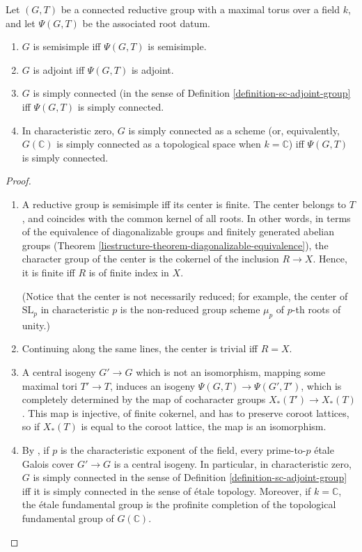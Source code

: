 \begin{proposition}
 \label{proposition-sc-adjoint-group}
Let $(G,T)$ be a connected reductive group with a maximal torus over a field $k$, and let $\Psi(G,T)$ be the associated root datum.
\begin{enumerate}
\item $G$ is semisimple iff $\Psi(G,T)$ is semisimple.
\item $G$ is adjoint iff $\Psi(G,T)$ is adjoint.
\item $G$ is simply connected (in the sense of Definition \ref{definition-sc-adjoint-group} iff $\Psi(G,T)$ is simply connected. 
\item In characteristic zero, $G$ is simply connected as a scheme (or, equivalently, $G(\mathbb C)$ is simply connected as a topological space when $k=\mathbb C$) iff $\Psi(G,T)$ is simply connected.
\end{enumerate}

\end{proposition}

\begin{proof}
\begin{enumerate}
 \item A reductive group is semisimple iff its center is finite. The center belongs to $T$, and coincides with the common kernel of all roots. In other words, in terms of the equivalence of diagonalizable groups and finitely generated abelian groups (Theorem \ref{liestructure-theorem-diagonalizable-equivalence}), the character group of the center is the cokernel of the inclusion $R\to X$. Hence, it is finite iff $R$ is of finite index in $X$.
 
 (Notice that the center is not necessarily reduced; for example, the center of $\text{SL}_p$ in characteristic $p$ is the non-reduced group scheme $\mu_p$ of $p$-th roots of unity.)
 
 \item Continuing along the same lines, the center is trivial iff $R=X$.
 
 \item A central isogeny $G'\to G$ which is not an isomorphism, mapping some maximal tori $T'\to T$,  induces an isogeny $\Psi(G,T)\to \Psi(G',T')$, which is completely determined by the map of cocharacter groups $X_*(T')\to X_*(T)$. This map is injective, of finite cokernel, and has to preserve coroot lattices, so if $X_*(T)$ is equal to the coroot lattice, the map is an isomorphism.
 
 \item By \cite[Theorem 1]{Brion-Szamuely}, if $p$ is the characteristic exponent of the field, every prime-to-$p$ \'etale Galois cover $G'\to G$ is a central isogeny. In particular, in characteristic zero, $G$ is simply connected in the sense of Definition \ref{definition-sc-adjoint-group} iff it is simply connected in the sense of \'etale topology. Moreover, if $k=\mathbb C$, the \'etale fundamental group is the profinite completion of the topological fundamental group of $G(\mathbb C)$. 
 
\end{enumerate}

\end{proof}


